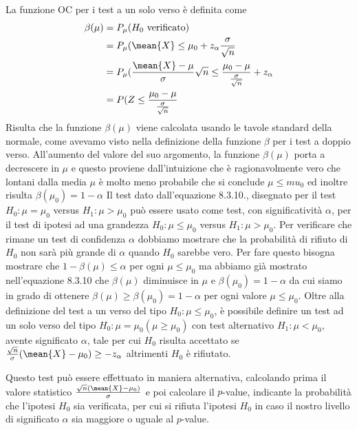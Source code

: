 La funzione OC per i test a un solo verso è definita come
\[  \begin{split}
    \beta(\mu) & = P_{\mu}(H_0 \mbox{ verificato}) \\
               & = P_{\mu}(\mean{X} \leq \mu_0 + z_{\alpha}\frac{\sigma}{\sqrt{n}} \\
               & = P_{\mu}(\frac{\mean{X} - \mu}{\sigma}{\sqrt{n}} \leq \frac{\mu_0 - \mu}{\frac{\sigma}{\sqrt{n}}} + z_{\alpha}\\
               & = P(Z \leq \frac{\mu_0 - \mu}{\frac{\sigma}{\sqrt{n}}} \\
    \end{split} \]
Risulta che la funzione $\beta(\mu)$ viene calcolata usando le tavole standard della normale, come avevamo visto nella
definizione della funzione $\beta$ per i test a doppio verso.\newline
All'aumento del valore del suo argomento, la funzione $\beta(\mu)$ porta a decrescere in $\mu$ e questo proviene
dall'intuizione che è ragionavolmente vero che lontani dalla media $\mu$ è molto meno probabile che si conclude $\mu \leq mu_0$
ed inoltre risulta $\beta(\mu_0) = 1 - \alpha$
Il test dato dall'equazione 8.3.10., disegnato per il test $H_0:\mu = \mu_0$ versus $H_1:\mu > \mu_0$ può essere usato
come test, con significatività $\alpha$, per il test di ipotesi ad una grandezza $H_0:\mu \leq \mu_0$ versus $H_1: \mu > \mu_0$.\newline
Per verificare che rimane un test di confidenza $\alpha$ dobbiamo mostrare che la probabilità di rifiuto di $H_0$ non
sarà più grande di $\alpha$ quando $H_0$ sarebbe vero.\newline
Per fare questo bisogna mostrare che $1 - \beta(\mu) \leq \alpha$ per ogni $\mu \leq \mu_0$ ma abbiamo già mostrato
nell'equazione 8.3.10 che $\beta(\mu)$ diminuisce in $\mu$ e $\beta(\mu_0) = 1 - \alpha$ da cui siamo in grado di
ottenere $\beta(\mu) \geq \beta(\mu_0) = 1 - \alpha$ per ogni valore $\mu \leq \mu_0$.\newline
Oltre alla definizione del test a un verso del tipo $H_0:\mu \leq \mu_0$, è possibile definire un test ad un solo verso 
del tipo $H_0:\mu = \mu_0(\mu \geq \mu_0)$ con test alternativo $H_1:\mu < \mu_0$, avente significato $\alpha$, tale per
cui $H_0$ risulta accettato se $\frac{\sqrt{n}}{\sigma} (\mean{X} - \mu_0) \geq -z_{\alpha}$ altrimenti $H_0$ è rifiutato.

Questo test può essere effettuato in maniera alternativa, calcolando prima il valore statistico $\frac{\sqrt{n}(\mean{X} -
\mu_0)}{\sigma}$ e poi calcolare il $p$-value, indicante la probabilità che l'ipotesi $H_0$ sia verificata, per cui si
rifiuta l'ipotesi $H_0$ in caso il nostro livello di significato $\alpha$ sia maggiore o uguale al $p$-value.

